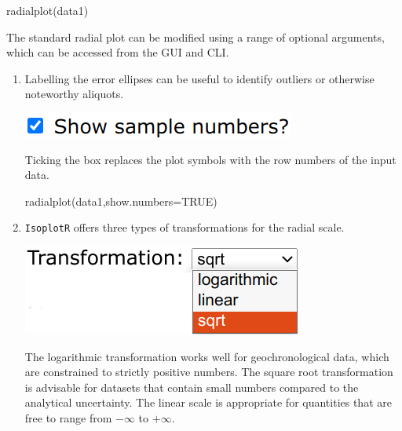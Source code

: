 \begin{refsection}
\begin{console}
radialplot(data1)
\end{console}

The standard radial plot can be modified using a range of optional
arguments, which can be accessed from the GUI and CLI.

\begin{enumerate}

\item Labelling the error ellipses can be useful to identify outliers
  or otherwise noteworthy aliquots.

  \noindent\begin{minipage}[t]{.28\linewidth}
  \strut\vspace*{-\baselineskip}\newline
  \includegraphics[width=\linewidth]{../figures/concordiashownumbers.png}
\end{minipage}
\begin{minipage}[t]{.72\linewidth}
  Ticking the box replaces the plot symbols with the row numbers of
  the input data.
\end{minipage}

\begin{console}
radialplot(data1,show.numbers=TRUE)
\end{console}
  
\item \texttt{IsoplotR} offers three types of transformations for the
  radial scale.
  
\noindent\begin{minipage}[t]{.3\linewidth}
  \strut\vspace*{-\baselineskip}\newline
  \includegraphics[width=\linewidth]{../figures/UPbRadialTransformation.png}
\end{minipage}
\begin{minipage}[t]{.7\linewidth}
The logarithmic transformation works well for geochronological data,
which are constrained to strictly positive numbers. The square root
transformation is advisable for datasets that contain small numbers
compared to the analytical uncertainty.  The linear scale is
appropriate for quantities that are free to range from $-\infty$ to
$+\infty$.
\end{minipage}


\end{enumerate}
\end{refsection}
